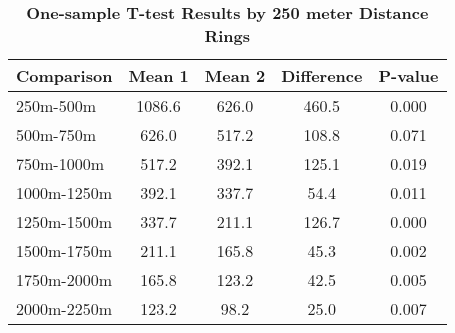 \begin{table}[htbp]
\centering
\begin{tabular}{l|c c c c}
\hline
Comparison & Mean 1 & Mean 2 & Difference & P-value \\
\hline
250m-500m & 1086.6 & 626.0 & 460.5 & 0.000 \\
500m-750m & 626.0 & 517.2 & 108.8 & 0.071 \\
750m-1000m & 517.2 & 392.1 & 125.1 & 0.019 \\
1000m-1250m & 392.1 & 337.7 & 54.4 & 0.011 \\
1250m-1500m & 337.7 & 211.1 & 126.7 & 0.000 \\
1500m-1750m & 211.1 & 165.8 & 45.3 & 0.002 \\
1750m-2000m & 165.8 & 123.2 & 42.5 & 0.005 \\
2000m-2250m & 123.2 & 98.2 & 25.0 & 0.007 \\
\hline
\end{tabular}
\caption{\textbf{One-sample T-test Results by 250 meter Distance Rings}}
\label{tab:ttests}
\end{table}
